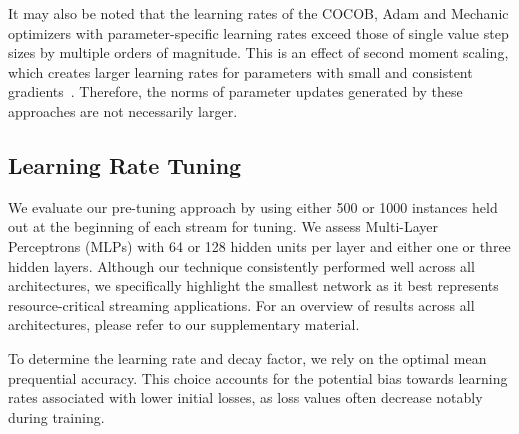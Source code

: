 \documentclass{article} %
\begin{document}
It may also be noted that the learning rates of the COCOB, Adam and Mechanic optimizers with parameter-specific learning rates exceed those of single value step sizes by multiple orders of magnitude.
This is an effect of second moment scaling, which creates larger learning rates for parameters with small and consistent gradients~\citep{cutkoskyMechanicLearningRate2023}.
Therefore, the norms of parameter updates generated by these approaches are not necessarily larger.


\subsection{Learning Rate Tuning}

We evaluate our pre-tuning approach by using either 500 or 1000 instances held out at the beginning of each stream for tuning. We assess Multi-Layer Perceptrons (MLPs) with 64 or 128 hidden units per layer and either one or three hidden layers.
Although our technique consistently performed well across all architectures, we specifically highlight the smallest network as it best represents resource-critical streaming applications. For an overview of results across all architectures, please refer to our supplementary material.

To determine the learning rate and decay factor, we rely on the optimal mean prequential accuracy. This choice accounts for the potential bias towards learning rates associated with lower initial losses, as loss values often decrease notably during training.
\end{document}
